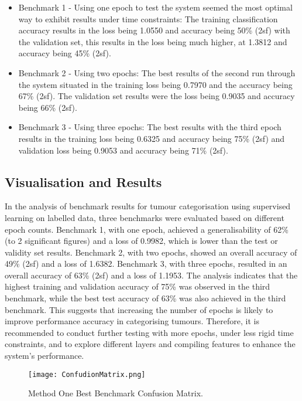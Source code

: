 \documentclass[conference]{IEEEtran}
\begin{document}
\begin{itemize}
\item Benchmark 1 - Using one epoch to test the system seemed the most optimal way to exhibit results under time constraints: The training classification accuracy results in the loss being 1.0550 and accuracy being 50\% (2sf) with the validation set, this results in the loss being much higher, at 1.3812 and accuracy being 45\% (2sf).
\item Benchmark 2 - Using two epochs: The best results of the second run through the system situated in the training loss being 0.7970 and the accuracy being 67\% (2sf). The validation set results were the loss being  0.9035 and accuracy being 66\% (2sf).
\item Benchmark 3 - Using three epochs: The best results with the third epoch results in the training loss being 0.6325 and accuracy being 75\% (2sf) and validation loss being 0.9053 and accuracy being 71\% (2sf).
\end{itemize}

\subsection{Visualisation and Results}
In the analysis of benchmark results for tumour categorisation using supervised learning on labelled data, three benchmarks were evaluated based on different epoch counts. Benchmark 1, with one epoch, achieved a generalisability of 62\% (to 2 significant figures) and a loss of 0.9982, which is lower than the test or validity set results. Benchmark 2, with two epochs, showed an overall accuracy of 49\% (2sf) and a loss of 1.6382. Benchmark 3, with three epochs, resulted in an overall accuracy of 63\% (2sf) and a loss of 1.1953. The analysis indicates that the highest training and validation accuracy of 75\% was observed in the third benchmark, while the best test accuracy of 63\% was also achieved in the third benchmark. This suggests that increasing the number of epochs is likely to improve performance accuracy in categorising tumours. Therefore, it is recommended to conduct further testing with more epochs, under less rigid time constraints, and to explore different layers and compiling features to enhance the system's performance.

\begin{figure}[htbp]            
   \centerline{\texttt{[image: ConfudionMatrix.png]}}
    \caption{Method One Best Benchmark Confusion Matrix.}
    \label{fig}
\end{figure}
\end{document}
